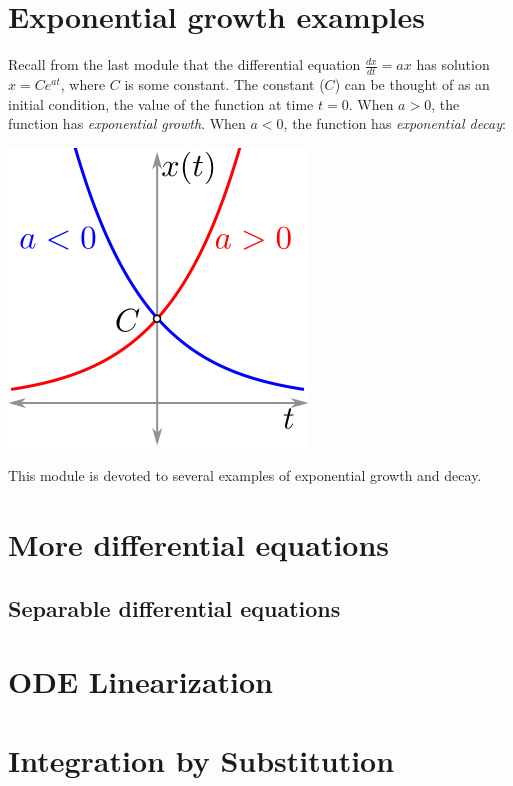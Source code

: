 \documentclass[twoside,openright,titlepage,a4paper]{book}
\begin{document}
\begin{sloppypar}
\section{Exponential growth examples} \label{ChIntegrationSecExponentialGrowthExamples}

Recall from the last module that the differential equation $\frac{dx}{dt} = ax$ has solution $x = Ce^{at}$, where $C$ is some constant. The constant ($C$) can be thought of as an initial condition, the value of the function at time $t=0$. When $a>0$, the function has \textit{exponential growth}. When $a<0$, the function has \textit{exponential decay}:
\begin{center}\includegraphics[scale=0.6]{ExponentialGrowthDecay}\end{center}

This module is devoted to several examples of exponential growth and decay.

\section{More differential equations} \label{ChIntegrationSecMoreDifferentialEquations}
\subsection{Separable differential equations} \label{ChIntegrationSecMoreDifferentialEquationsSubsecSeparableDifferentialEquations}
\section{ODE Linearization} \label{ChIntegrationSecODELinearization}
\section{Integration by Substitution} \label{ChIntegrationSecIntegrationBySubstitution}

\end{sloppypar}
\end{document}
